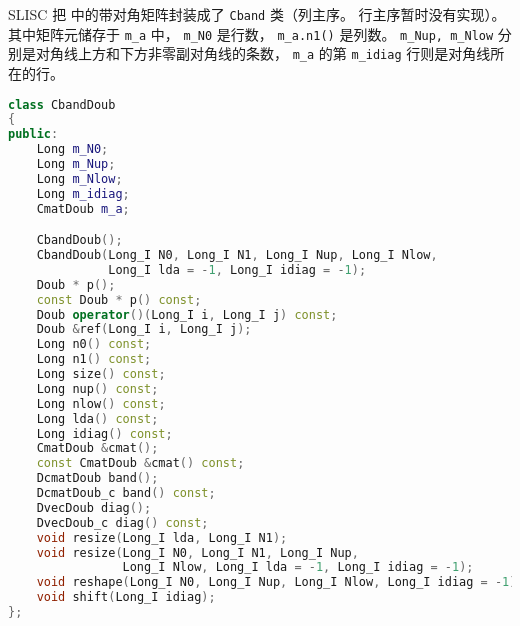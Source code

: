 
\begin{issues}
\issueDraft
\end{issues}


SLISC 把  中的带对角矩阵封装成了 \verb`Cband` 类（列主序。 行主序暂时没有实现）。 其中矩阵元储存于 \verb`m_a` 中， \verb`m_N0` 是行数， \verb`m_a.n1()` 是列数。 \verb`m_Nup, m_Nlow` 分别是对角线上方和下方非零副对角线的条数， \verb`m_a` 的第 \verb`m_idiag` 行则是对角线所在的行。
\begin{lstlisting}[language=cpp]
class CbandDoub
{
public:
    Long m_N0;
    Long m_Nup;
    Long m_Nlow;
    Long m_idiag;
    CmatDoub m_a;

    CbandDoub();
    CbandDoub(Long_I N0, Long_I N1, Long_I Nup, Long_I Nlow,
              Long_I lda = -1, Long_I idiag = -1);
    Doub * p();
    const Doub * p() const;
    Doub operator()(Long_I i, Long_I j) const;
    Doub &ref(Long_I i, Long_I j);
    Long n0() const;
    Long n1() const;
    Long size() const;
    Long nup() const;
    Long nlow() const;
    Long lda() const;
    Long idiag() const;
    CmatDoub &cmat();
    const CmatDoub &cmat() const;
    DcmatDoub band();
    DcmatDoub_c band() const;
    DvecDoub diag();
    DvecDoub_c diag() const;
    void resize(Long_I lda, Long_I N1);
    void resize(Long_I N0, Long_I N1, Long_I Nup,
                Long_I Nlow, Long_I lda = -1, Long_I idiag = -1);
    void reshape(Long_I N0, Long_I Nup, Long_I Nlow, Long_I idiag = -1);
    void shift(Long_I idiag);
};
\end{lstlisting}
